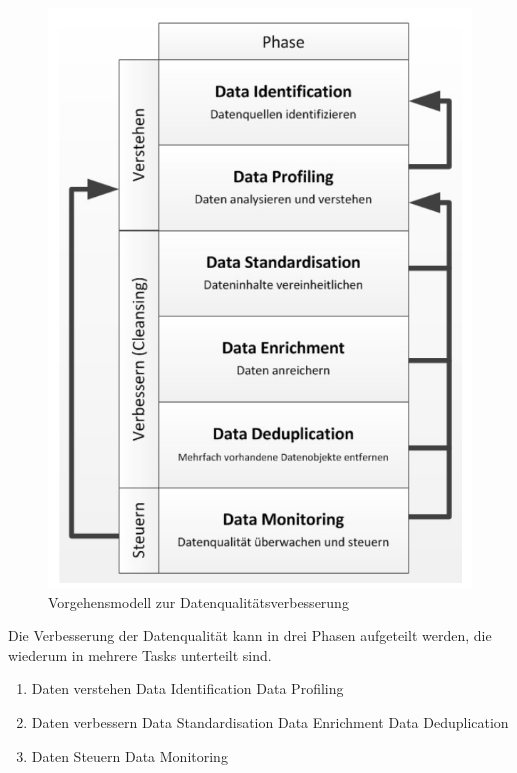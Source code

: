 \documentclass[a4paper, 11pt, nofootinbib]{article}
\begin{document}
\begin{figure}
	\centering
	\includegraphics[keepaspectratio=true,height=18\baselineskip]{dataImprovement.PNG}
	\caption{Vorgehensmodell zur Datenqualitätsverbesserung}
\end{figure}

Die Verbesserung der Datenqualität kann in drei Phasen aufgeteilt werden, die wiederum in mehrere Tasks unterteilt sind.

\begin{enumerate}
	\item Daten verstehen
		\subitem Data Identification
		\subitem Data Profiling
	\item Daten verbessern
		\subitem Data Standardisation
		\subitem Data Enrichment
		\subitem Data Deduplication
	\item Daten Steuern
		\subitem Data Monitoring
\end{enumerate}
\end{document}
